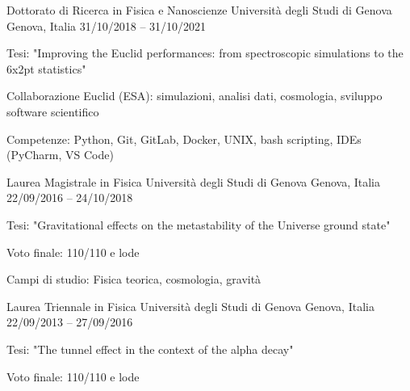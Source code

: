 


\begin{cventries}


\cventry
{Dottorato di Ricerca in Fisica e Nanoscienze} %
{Università degli Studi di Genova} %
{Genova, Italia} %
{31/10/2018 -- 31/10/2021} %
{ %
\begin{cvitems}
\item {Tesi: "Improving the Euclid performances: from spectroscopic simulations to the 6x2pt statistics"}
\item {Collaborazione Euclid (ESA): simulazioni, analisi dati, cosmologia, sviluppo software scientifico}
\item {Competenze: Python, Git, GitLab, Docker, UNIX, bash scripting, IDEs (PyCharm, VS Code)}
\end{cvitems}
}


\cventry
{Laurea Magistrale in Fisica} %
{Università degli Studi di Genova} %
{Genova, Italia} %
{22/09/2016 -- 24/10/2018} %
{ %
\begin{cvitems}
\item {Tesi: "Gravitational effects on the metastability of the Universe ground state"}
\item {Voto finale: 110/110 e lode}
\item {Campi di studio: Fisica teorica, cosmologia, gravità}
\end{cvitems}
}


\cventry
{Laurea Triennale in Fisica} %
{Università degli Studi di Genova} %
{Genova, Italia} %
{22/09/2013 -- 27/09/2016} %
{ %
\begin{cvitems}
\item {Tesi: "The tunnel effect in the context of the alpha decay"}
\item {Voto finale: 110/110 e lode}
\end{cvitems}
}


\end{cventries}
